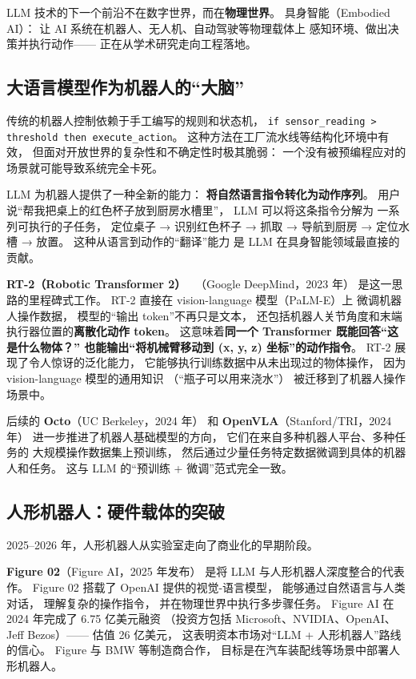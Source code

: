 LLM 技术的下一个前沿不在数字世界，而在\textbf{物理世界}。
具身智能（Embodied AI）：
让 AI 系统在机器人、无人机、自动驾驶等物理载体上
感知环境、做出决策并执行动作——
正在从学术研究走向工程落地。

\subsection{大语言模型作为机器人的“大脑”}

传统的机器人控制依赖于手工编写的规则和状态机，
\texttt{if sensor\_reading > threshold then execute\_action}。
这种方法在工厂流水线等结构化环境中有效，
但面对开放世界的复杂性和不确定性时极其脆弱：
一个没有被预编程应对的场景就可能导致系统完全卡死。

LLM 为机器人提供了一种全新的能力：
\textbf{将自然语言指令转化为动作序列}。
用户说“帮我把桌上的红色杯子放到厨房水槽里”，
LLM 可以将这条指令分解为
一系列可执行的子任务，
定位桌子 → 识别红色杯子 → 抓取 → 导航到厨房 →
定位水槽 → 放置。
这种从语言到动作的“翻译”能力
是 LLM 在具身智能领域最直接的贡献。

\textbf{RT-2（Robotic Transformer 2）}~\cite{brohan2023rt2}
（Google DeepMind，2023 年）
是这一思路的里程碑式工作。
RT-2 直接在 vision-language 模型（PaLM-E）上
微调机器人操作数据，
模型的“输出 token”不再只是文本，
还包括机器人关节角度和末端执行器位置的\textbf{离散化动作 token}。
这意味着\textbf{同一个 Transformer
既能回答“这是什么物体？”
也能输出“将机械臂移动到 (x, y, z) 坐标”的动作指令}。
RT-2 展现了令人惊讶的泛化能力，
它能够执行训练数据中从未出现过的物体操作，
因为 vision-language 模型的通用知识
（“瓶子可以用来浇水”）
被迁移到了机器人操作场景中。

后续的 \textbf{Octo}（UC Berkeley，2024 年）
和 \textbf{OpenVLA}（Stanford/TRI，2024 年）
进一步推进了机器人基础模型的方向，
它们在来自多种机器人平台、多种任务的
大规模操作数据集上预训练，
然后通过少量任务特定数据微调到具体的机器人和任务。
这与 LLM 的“预训练 + 微调”范式完全一致。

\subsection{人形机器人：硬件载体的突破}

2025--2026 年，人形机器人从实验室走向了商业化的早期阶段。

\textbf{Figure 02}（Figure AI，2025 年发布）
是将 LLM 与人形机器人深度整合的代表作。
Figure 02 搭载了 OpenAI 提供的视觉-语言模型，
能够通过自然语言与人类对话，
理解复杂的操作指令，
并在物理世界中执行多步骤任务。
Figure AI 在 2024 年完成了 6.75 亿美元融资
（投资方包括 Microsoft、NVIDIA、OpenAI、Jeff Bezos）——
估值 26 亿美元，
这表明资本市场对“LLM + 人形机器人”路线的信心。
Figure 与 BMW 等制造商合作，
目标是在汽车装配线等场景中部署人形机器人。

